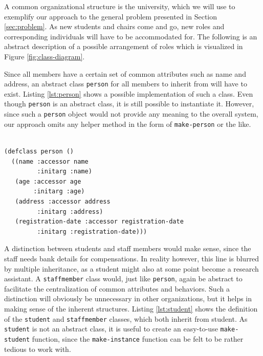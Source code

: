 \documentclass[oribibl]{llncs}
\begin{document}
A common organizational structure is the university, which we will use to exemplify our approach to the general problem presented in Section \ref{sec:problem}. As new students and chairs come and go, new roles and corresponding individuals will have to be accommodated for. The following is an abstract description of a possible arrangement of roles which is visualized in Figure \ref{fig:class-diagram}. 

Since all members have a certain set of common attributes such as name and address, an abstract class \texttt{person} for all members to inherit from will have to exist. Listing \ref{lst:person} shows a possible implementation of such a class. Even though \texttt{person} is an abstract class, it is still possible to instantiate it. However, since such a \texttt{person} object would not provide any meaning to the overall system, our approach omits any helper method in the form of \texttt{make-person} or the like.

\begin{listing}[]%
    \centering
\begin{verbatim}

(defclass person ()
  ((name :accessor name
         :initarg :name)
   (age :accessor age
        :initarg :age)
   (address :accessor address
         :initarg :address)
   (registration-date :accessor registration-date
         :initarg :registration-date)))
\end{verbatim}
\caption{The basic \texttt{person} class}
\label{lst:person}
\end{listing}

A distinction between students and staff members would make sense, since the staff needs bank details for compensations. In reality however, this line is blurred by multiple inheritance, as a student might also at some point become a research assistant. A \texttt{staffmember} class would, just like \texttt{person}, again be abstract to facilitate the centralization of common attributes and behaviors. Such a distinction will obviously be unnecessary in other organizations, but it helps in making sense of the inherent structures. Listing \ref{lst:student} shows the definition of the \texttt{student} and \texttt{staffmember} classes, which both inherit from student. As \texttt{student} is not an abstract class, it is useful to create an easy-to-use \texttt{make-student} function, since the \texttt{make-instance} function can be felt to be rather tedious to work with.
\end{document}
